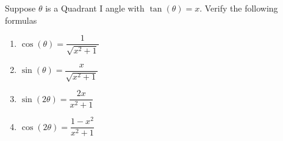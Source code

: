 {\label{preludetoarctrigtan} Suppose $\theta$ is a Quadrant I angle with $\tan(\theta) = x$. Verify the following formulas

\begin{enumerate}
\item $\cos(\theta) = \dfrac{1}{\sqrt{x^2+1}}$
\item $\sin(\theta) = \dfrac{x}{\sqrt{x^2+1}}$
\item $\sin(2\theta) = \dfrac{2x}{x^2+1}$
\item $\cos(2\theta) = \dfrac{1-x^2}{x^2+1}$
\end{enumerate}}
{}
